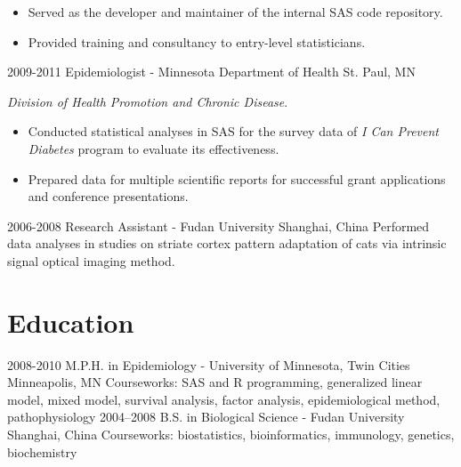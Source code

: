 \begin{entrylist}
{\begin{itemize}
        \item Served as the developer and maintainer of the internal SAS code repository.
        \item Provided training and consultancy to entry-level statisticians.
      \end{itemize}
    }
  \entry
    {2009-2011}
    {Epidemiologist - Minnesota Department of Health}
    {St. Paul, MN}
    {
      \textit{Division of Health Promotion and Chronic Disease}.
      \begin{itemize}
        \item Conducted statistical analyses in SAS for the survey data of \textit{I Can Prevent Diabetes} program to evaluate its effectiveness.
        \item Prepared data for multiple scientific reports for successful grant applications and conference presentations.
      \end{itemize}
    }
  \entry
    {2006-2008}
    {Research Assistant - Fudan University}
    {Shanghai, China}
    {
      Performed data analyses in studies on striate cortex pattern adaptation of cats via intrinsic signal optical imaging method.
    }
\end{entrylist}

\section{Education}

\begin{entrylist}
  \entry
    {2008-2010}
    {M.P.H. in Epidemiology - University of Minnesota, Twin Cities}
    {Minneapolis, MN}
    {Courseworks: SAS and R programming, generalized linear model, mixed model, survival analysis, factor analysis, epidemiological method, pathophysiology}
  \entry
    {2004–2008}
    {B.S. in Biological Science - Fudan University}
    {Shanghai, China}
    {Courseworks: biostatistics, bioinformatics, immunology, genetics, biochemistry}
\end{entrylist}
